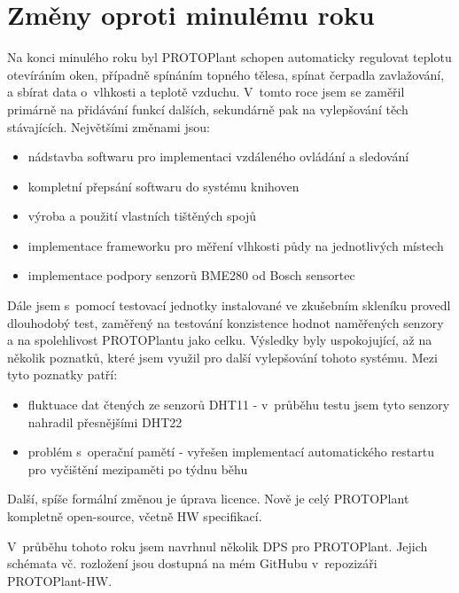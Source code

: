 \chapter{Změny oproti minulému roku}
Na konci minulého roku byl PROTOPlant schopen automaticky regulovat teplotu otevíráním oken, případně spínáním topného tělesa, spínat čerpadla zavlažování, a sbírat data o~vlhkosti a teplotě vzduchu. V~tomto roce jsem se zaměřil primárně na přidávání funkcí dalších, sekundárně pak na vylepšování těch stávajících.
Největšími změnami jsou: 
\begin{itemize}
    \item nádstavba softwaru pro implementaci vzdáleného ovládání a sledování
	\item kompletní přepsání softwaru do systému knihoven
	\item výroba a použití vlastních tištěných spojů
	\item implementace frameworku pro měření vlhkosti půdy na jednotlivých místech
	\item implementace podpory senzorů BME280 od Bosch sensortec
\end{itemize}

Dále jsem s~pomocí testovací jednotky instalované ve zkušebním skleníku provedl dlouhodobý test, zaměřený na testování konzistence hodnot naměřených senzory a na spolehlivost PROTOPlantu jako celku. Výsledky byly uspokojující, až na několik poznatků, které jsem využil pro další vylepšování tohoto systému. Mezi tyto poznatky patří:
\begin{itemize}
    \item fluktuace dat čtených ze senzorů DHT11 - v~průběhu testu jsem tyto senzory nahradil přesnějšími DHT22
    \item problém s~operační pamětí - vyřešen implementací automatického restartu pro vyčištění mezipaměti po týdnu běhu
\end{itemize}

Další, spíše formální změnou je úprava licence. Nově je celý PROTOPlant kompletně open-source, včetně HW specifikací.

V~průběhu tohoto roku jsem navrhnul několik DPS pro PROTOPlant. 
Jejich schémata vč. rozložení jsou dostupná na mém GitHubu v~repozizáři PROTOPlant-HW. 
\newpage